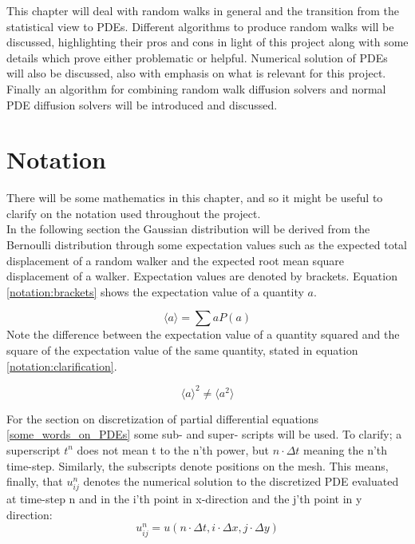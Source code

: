 
This chapter will deal with random walks in general and the transition from the statistical view to PDEs. 
Different algorithms to produce random walks will be discussed, highlighting their pros and cons in light of this project along with some details which prove either problematic or helpful. 
Numerical solution of PDEs will also be discussed, also with emphasis on what is relevant for this project. 
Finally an algorithm for combining random walk diffusion solvers and normal PDE diffusion solvers will be introduced and discussed.

\section{Notation}

There will be some mathematics in this chapter, and so it might be useful to clarify on the notation used throughout the project.\\

In the following section the Gaussian distribution will be derived from the Bernoulli distribution through some expectation values such as the expected total displacement of a random walker and the expected root mean square displacement of a walker. 
Expectation values are denoted by brackets. Equation \eqref{notation:brackets} shows the expectation value of a quantity $a$. 

\begin{equation}\label{notation:brackets}
 \langle a \rangle = \sum aP(a)
\end{equation}
Note the difference between the expectation value of a quantity squared and the square of the expectation value of the same quantity, stated in equation \ref{notation:clarification}.

\begin{equation}\label{notation:clarification}
 \langle a \rangle^2 \neq \langle a^2 \rangle
\end{equation}

For the section on discretization of partial differential equations \ref{some_words_on_PDEs} some sub- and super- scripts will be used. 
To clarify; a superscript $t^n$ does not mean t to the n'th power, but $n\cdot\Delta t$ meaning the n'th time-step. 
Similarly, the subscripts denote positions on the mesh. This means, finally, that $u^n_{ij}$ denotes the numerical solution to the discretized PDE evaluated at time-step n and in the i'th point in x-direction and the j'th point in y direction:
\begin{equation*}
 u^n_{ij} = u(n\cdot\Delta t,i\cdot\Delta x, j\cdot\Delta y)
\end{equation*}

